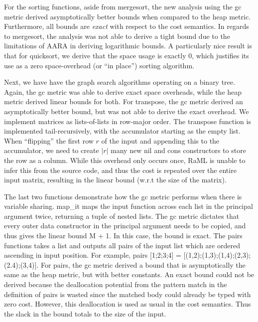 \documentclass{easychair}
\theoremstyle{definition}
\begin{document}
For the sorting functions, aside from mergesort, the new analysis using the gc metric
derived asymptotically better bounds when compared to the heap metric. Furthermore,
all bounds are \emph{exact} with respect to the cost semantics. In regards to mergesort, 
the analysis was not able to derive a tight bound due to the limitations of AARA in deriving 
logarithmic bounds. A particularly nice result is that for quicksort, we derive that
the space usage is exactly 0, which justifies its use as a zero space-overhead 
(or ``in  place'') sorting algorithm.

Next, we have have the graph search algorithms operating on a binary tree. Again, the gc metric
was able to derive exact space overheads, while the heap metric derived linear bounds for both.
%
For transpose, the gc metric derived an asymptotically better bound, but was not able to derive 
the exact overhead. We implement matrices as lists-of-lists in row-major order. 
The transpose function is implemented tail-recursively, with the accumulator starting as the 
empty list. When ``flipping'' the first row $r$ of the input and appending this to the accumulator, 
we need to create $|r|$ many new nil and cons constructors to store the row as a column. While this
overhead only occurs once, RaML is unable to infer this from the source code, and thus the cost
is repeated over the entire input matrix, resulting in the linear bound (w.r.t the size of the 
matrix). 

The last two functions demonstrate how the gc metric performs when there is variable sharing.
map\_it maps the input function across each list in the principal argument twice, returning a
tuple of nested lists. The gc metric dictates that every outer data constructor in the 
principal argument needs to be copied, and thus gives the linear bound M + 1. In this case,
the bound is exact. The pairs functions takes a list and outputs all pairs of the input list 
which are ordered ascending in input position. For example, 
pairs [1;2;3;4] = [(1,2);(1,3);(1,4);(2,3);(2.4);(3,4)]. For pairs, the gc metric derived a bound
that is asymptotically the same as the heap metric, but with better constants. An exact bound 
could not be derived because the deallocation potential from the pattern match in the 
definition of pairs is wasted since the matched body could already be typed with zero cost. 
However, this deallocation is used as usual in the cost semantics. Thus the slack in the bound 
totals to the size of the input. %
\end{document}
